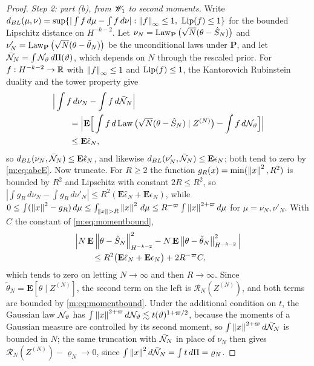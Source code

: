 \begin{proof}
\emph{Step 2: part (b), from $\mathscr{W}_1$ to second moments.} Write $d_{BL}(\mu,\nu)=\sup\{|\int f\,d\mu-\int f\,d\nu|:\left\|f\right\|_\infty\le1,\ \operatorname{Lip}(f)\le1\}$ for the bounded Lipschitz distance on $H^{-k-2}$. Let $\nu_N=\operatorname{Law}_{\mathbf{P}}\big(\sqrt N(\theta-\hat S_N)\big)$ and $\nu'_N=\operatorname{Law}_{\mathbf{P}}\big(\sqrt N(\theta-\tilde\theta_N)\big)$ be the unconditional laws under $\mathbf{P}$, and let $\bar{\mathcal{N}}_N=\int\mathcal{N}_\vartheta\,d\Pi(\vartheta)$, which depends on $N$ through the rescaled prior. For $f:H^{-k-2}\to\mathbb{R}$ with $\left\|f\right\|_\infty\le1$ and $\operatorname{Lip}(f)\le1$, the Kantorovich Rubinstein duality and the tower property give
\[
\begin{aligned}
&\Big|\int f\,d\nu_N-\int f\,d\bar{\mathcal{N}}_N\Big|\\
&\qquad=\Big|\mathbf{E}\Big[\int f\,d\operatorname{Law}\big(\sqrt N(\theta-\hat S_N)\mid Z^{(N)}\big)-\int f\,d\mathcal{N}_\vartheta\Big]\Big|\\
&\qquad\le\mathbf{E}\hat\epsilon_N ,
\end{aligned}
\]
so $d_{BL}(\nu_N,\bar{\mathcal{N}}_N)\le\mathbf{E}\hat\epsilon_N$, and likewise $d_{BL}(\nu'_N,\bar{\mathcal{N}}_N)\le\mathbf{E}\epsilon_N$; both tend to zero by \eqref{m:eq:abcE}. Now truncate. For $R\ge2$ the function $g_R(x)=\min(\left\|x\right\|^2,R^2)$ is bounded by $R^2$ and Lipschitz with constant $2R\le R^2$, so $|\int g_R\,d\nu_N-\int g_R\,d\nu'_N|\le R^2(\mathbf{E}\hat\epsilon_N+\mathbf{E}\epsilon_N)$, while $0\le\int(\norm x^2-g_R)\,d\mu\le\int_{\norm x>R}\norm x^2\,d\mu\le R^{-\varpi}\int\norm x^{2+\varpi}d\mu$ for $\mu=\nu_N,\nu'_N$. With $C$ the constant of \eqref{m:eq:momentbound},
\[
\begin{aligned}
&\Big|N\,\mathbf{E}\left\|\theta-\hat S_N\right\|^2_{H^{-k-2}}-N\,\mathbf{E}\left\|\theta-\tilde\theta_N\right\|^2_{H^{-k-2}}\Big|\\
&\qquad\le R^2\big(\mathbf{E}\hat\epsilon_N+\mathbf{E}\epsilon_N\big)+2R^{-\varpi}C ,
\end{aligned}
\]
which tends to zero on letting $N\to\infty$ and then $R\to\infty$. Since $\tilde\theta_N=\mathbf{E}[\theta\mid Z^{(N)}]$, the second term on the left is $\mathcal R_N(Z^{(N)})$, and both terms are bounded by \eqref{m:eq:momentbound}. Under the additional condition on $t$, the Gaussian law $\mathcal{N}_\vartheta$ has $\int\left\|x\right\|^{2+\varpi}d\mathcal{N}_\vartheta\lesssim t(\vartheta)^{1+\varpi/2}$, because the moments of a Gaussian measure are controlled by its second moment, so $\int\left\|x\right\|^{2+\varpi}d\bar{\mathcal{N}}_N$ is bounded in $N$; the same truncation with $\bar{\mathcal{N}}_N$ in place of $\nu_N$ then gives $\mathcal R_N(Z^{(N)})-\varrho_N\to0$, since $\int\left\|x\right\|^2d\bar{\mathcal{N}}_N=\int t\,d\Pi=\varrho_N$.


\end{proof}

